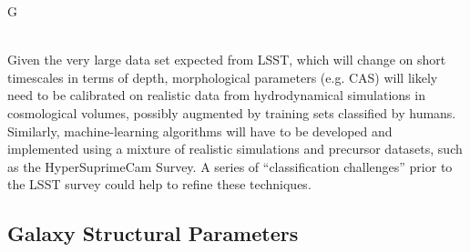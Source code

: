 {\begin{tasklist}{G}
\begin{task}
{\\
Given the very large data set expected from LSST, which will change on short timescales in terms of depth, morphological parameters (e.g. CAS) will likely need to be calibrated on realistic data from hydrodynamical simulations in cosmological volumes, possibly augmented by training sets classified by humans. Similarly, machine-learning algorithms will have to be developed and implemented using a mixture of realistic simulations and precursor datasets, such as the HyperSuprimeCam Survey. A series of ``classification challenges'' prior to the LSST survey could help to refine these techniques. 
}
~\\
\end{task}


\subsection{Galaxy Structural Parameters}


\end{tasklist}}
